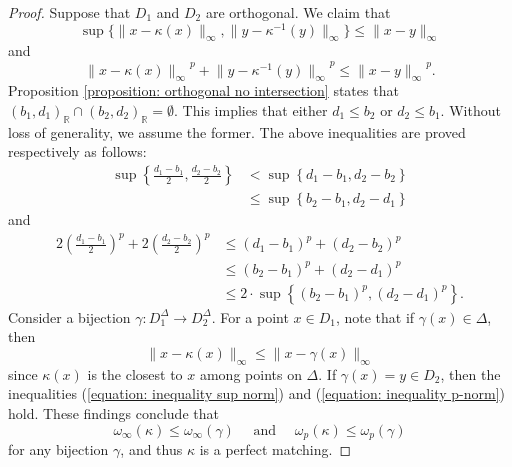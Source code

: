 \documentclass[10pt,a4paper]{amsart}
\begin{document}
\begin{proof}
	Suppose that $D_1$ and $D_2$ are orthogonal. We claim that
	\begin{equation}\label{equation: inequality sup norm}
		\sup \big\{\|x-\kappa(x)\|_{\infty},\|y-\kappa^{-1}(y)\|_{\infty}\big\} \leq\|x-y\|_{\infty}
	\end{equation}
	and
	\begin{equation}\label{equation: inequality p-norm}
		{\|x-\kappa(x)\|_\infty}^p+{\|y-\kappa^{-1}(y)\|_\infty}^p \leq {\|x-y\|_\infty}^p.
	\end{equation}
	Proposition \ref{proposition: orthogonal no intersection} states that $\left(b_1, d_1\right)_{\mathbb{R}} \cap\left(b_2, d_2\right)_{\mathbb{R}}=\emptyset$. This implies that either $d_1 \leq b_2$ or $d_2 \leq b_1$. Without loss of generality, we assume the former. The above inequalities are proved respectively as follows:
	\begin{align*}
		\sup \left\{\frac{d_1-b_1}{2}, \frac{d_2-b_2}{2}\right\} & <\sup \left\{d_1-b_1, d_2-b_2\right\} \\
		& \leq \sup \left\{b_2-b_1, d_2-d_1\right\}
	\end{align*}
	and
	\begin{align*}
		2\left(\frac{d_1-b_1}{2}\right)^p+2\left(\frac{d_2-b_2}{2}\right)^p & \leq\left(d_1-b_1\right)^p+\left(d_2-b_2\right)^p \\
		& \leq\left(b_2-b_1\right)^p+\left(d_2-d_1\right)^p\\
		& \leq 2 \cdot \sup\left\{\left(b_2-b_1\right)^p, \left(d_2-d_1\right)^p\right\}.
	\end{align*}
	Consider a bijection $\gamma: D_1^{\Delta} \rightarrow D_2^{\Delta}$. For a point $x \in D_1$, note that if $\gamma(x) \in \Delta$, then
	\begin{equation*}
		\|x-\kappa(x)\|_{\infty} \leq\|x-\gamma(x)\|_{\infty}
	\end{equation*}
	since $\kappa(x)$ is the closest to $x$ among points on $\Delta$. If $\gamma(x)=y \in D_2$, then the inequalities (\ref{equation: inequality sup norm}) and (\ref{equation: inequality p-norm}) hold. These findings conclude that
	\begin{equation*}
		\omega_{\infty}(\kappa) \leq \omega_{\infty}(\gamma) \quad \text { and } \quad \omega_p(\kappa) \leq \omega_p(\gamma)
	\end{equation*}
	for any bijection $\gamma$, and thus $\kappa$ is a perfect matching.
\end{proof}
\end{document}
